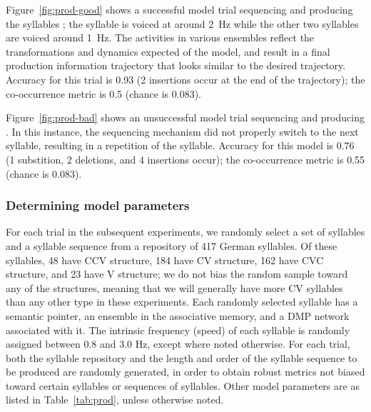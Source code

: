 Figure~\ref{fig:prod-good} shows
a successful model trial
sequencing and producing the syllables
;
the \ipa{[ti]} syllable is voiced
at around 2~Hz while the other
two syllables are voiced around 1~Hz.
The activities in various ensembles
reflect the transformations
and dynamics expected of the model,
and result in a final
production information trajectory
that looks similar
to the desired trajectory.
Accuracy for this trial is 0.93
(2 insertions occur at the end of the trajectory);
the co-occurrence metric is 0.5
(chance is 0.083).



Figure~\ref{fig:prod-bad}
shows an unsuccessful model trial
sequencing and producing
.
In this instance,
the sequencing mechanism did not properly
switch to the next syllable,
resulting in a repetition of the
\ipa{[ti]} syllable.
Accuracy for this model is 0.76
(1 substition, 2 deletions, and 4 insertions occur);
the co-occurrence metric is 0.55
(chance is 0.083).

\subsubsection{Determining model parameters}

For each trial in the subsequent experiments,
we randomly select a set of syllables
and a syllable sequence
from a repository of 417 German syllables.
Of these syllables,
48 have CCV structure,
184 have CV structure,
162 have CVC structure,
and 23 have V structure;
we do not bias the random sample
toward any of the structures,
meaning that we will generally
have more CV syllables
than any other type in these experiments.
Each randomly selected syllable
has a semantic pointer,
an ensemble in the associative memory,
and a DMP network associated with it.
The intrinsic frequency (speed)
of each syllable is randomly assigned
between 0.8 and 3.0 Hz,
except where noted otherwise.
For each trial,
both the syllable repository
and the length and order
of the syllable sequence
to be produced are randomly generated,
in order to obtain robust metrics
not biased toward certain syllables
or sequences of syllables.
Other model parameters are as listed in
Table~\ref{tab:prod},
unless otherwise noted.

